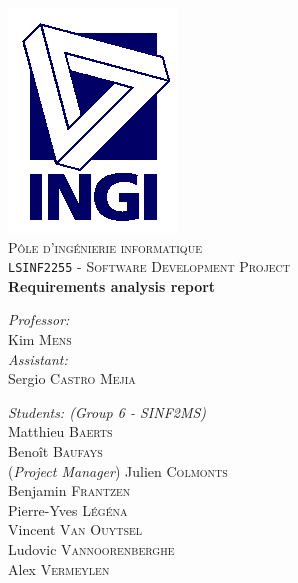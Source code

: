 \begin{titlepage}

\rm %

\begin{center}

\includegraphics[scale=.5]{ingi.png}\\[2cm]

\textsc{\LARGE Pôle d'ingénierie informatique}\\[1.5cm]

\textsc{\Large \texttt{LSINF2255} - Software Development Project}\\[0.5cm]


\vspace{3.5cm}
{ \huge \bfseries Requirements analysis report\vspace{0.8cm}}

\vspace{3.5cm}

\begin{minipage}{0.4\textwidth}
\begin{flushleft} \large
\emph{Professor:}\\
	Kim \textsc{Mens}\\
\vspace{1cm}
\emph{Assistant:}\\
	Sergio \textsc{Castro Mejia} %
\end{flushleft}
\end{minipage}
\begin{minipage}{0.4\textwidth}
\begin{flushright} \large
\emph{Students: (Group 6 - SINF2MS)} \\
	Matthieu \textsc{Baerts}\\
	Benoît \textsc{Baufays}\\
	(\textit{Project Manager}) Julien \textsc{Colmonts}\\
	Benjamin \textsc{Frantzen}\\
	Pierre-Yves \textsc{Légéna}\\
	Vincent \textsc{Van Ouytsel}\\
	Ludovic \textsc{Vannoorenberghe}\\
	Alex \textsc{Vermeylen}
\end{flushright}
\end{minipage}


\end{center}
\end{titlepage}
